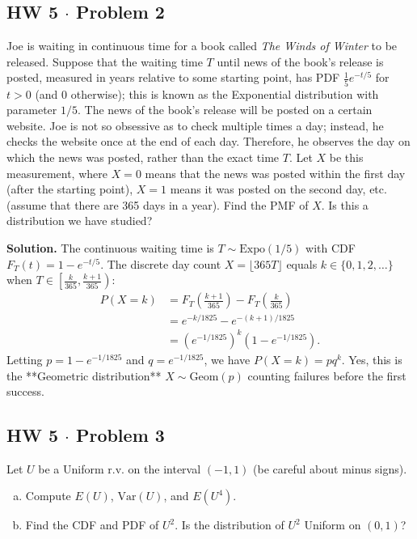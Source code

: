 \documentclass[11pt,a4paper]{article}
\begin{document}
\subsection{HW 5 $\cdot$ Problem 2}
\begin{tcolorbox}[title={HW 5 $\cdot$ Problem 2}]
Joe is waiting in continuous time for a book called \textit{The Winds of Winter} to be released. Suppose that the waiting time $T$ until news of the book's release is posted, measured in years relative to some starting point, has PDF $\frac{1}{5}e^{-t/5}$ for $t > 0$ (and 0 otherwise); this is known as the Exponential distribution with parameter $1/5$. The news of the book's release will be posted on a certain website.
Joe is not so obsessive as to check multiple times a day; instead, he checks the website once at the end of each day. Therefore, he observes the day on which the news was posted, rather than the exact time $T$. Let $X$ be this measurement, where $X = 0$ means that the news was posted within the first day (after the starting point), $X = 1$ means it was posted on the second day, etc. (assume that there are 365 days in a year). Find the PMF of $X$. Is this a distribution we have studied?
\end{tcolorbox}

\noindent \textbf{Solution.} The continuous waiting time is $T \sim \text{Expo}(1/5)$ with CDF $F_T(t) = 1 - e^{-t/5}$. The discrete day count $X = \lfloor 365T \rfloor$ equals $k \in \{0, 1, 2, \dots\}$ when $T \in \left[\frac{k}{365}, \frac{k+1}{365}\right)$:
\begin{align*}
P(X = k) &= F_T\left(\frac{k+1}{365}\right) - F_T\left(\frac{k}{365}\right) \\
&= e^{-k/1825} - e^{-(k+1)/1825} \\
&= \left( e^{-1/1825} \right)^k \left( 1 - e^{-1/1825} \right).
\end{align*}
Letting $p = 1 - e^{-1/1825}$ and $q = e^{-1/1825}$, we have $P(X = k) = p q^k$. Yes, this is the **Geometric distribution** $X \sim \text{Geom}(p)$ counting failures before the first success.

\vspace{10pt}
\subsection{HW 5 $\cdot$ Problem 3}
\begin{tcolorbox}[title={HW 5 $\cdot$ Problem 3}]
Let $U$ be a Uniform r.v. on the interval $(-1, 1)$ (be careful about minus signs).
\begin{enumerate}[(a)]
\item Compute $E(U)$, $\text{Var}(U)$, and $E(U^4)$.
\item Find the CDF and PDF of $U^2$. Is the distribution of $U^2$ Uniform on $(0, 1)$?
\end{enumerate}
\end{tcolorbox}
\end{document}
